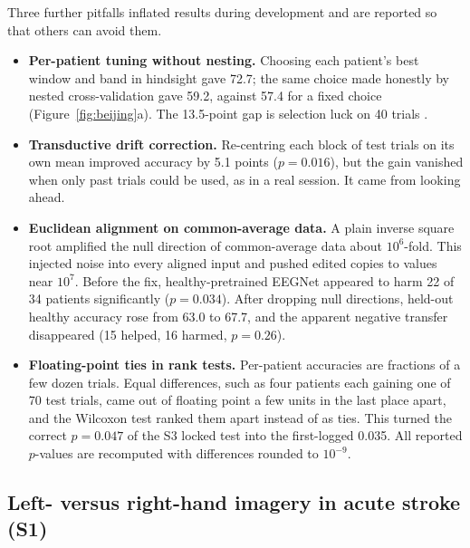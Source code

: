 Three further pitfalls inflated results during development and are reported so that others can avoid them.
\begin{itemize}
  \item \textbf{Per-patient tuning without nesting.} Choosing each patient's best window and band in hindsight gave 72.7\pct{}; the same choice made honestly by nested cross-validation gave 59.2\pct{}, against 57.4\pct{} for a fixed choice (Figure~\ref{fig:beijing}a). The 13.5-point gap is selection luck on 40 trials \citep{varoquaux2018}.
  \item \textbf{Transductive drift correction.} Re-centring each block of test trials on its own mean improved accuracy by 5.1 points ($p = 0.016$), but the gain vanished when only past trials could be used, as in a real session. It came from looking ahead.
  \item \textbf{Euclidean alignment on common-average data.} A plain inverse square root amplified the null direction of common-average data about $10^6$-fold. This injected noise into every aligned input and pushed edited copies to values near $10^7$. Before the fix, healthy-pretrained EEGNet appeared to harm 22 of 34 patients significantly ($p = 0.034$). After dropping null directions, held-out healthy accuracy rose from 63.0\pct{} to 67.7\pct{}, and the apparent negative transfer disappeared (15 helped, 16 harmed, $p = 0.26$).
  \item \textbf{Floating-point ties in rank tests.} Per-patient accuracies are fractions of a few dozen trials. Equal differences, such as four patients each gaining one of 70 test trials, came out of floating point a few units in the last place apart, and the Wilcoxon test ranked them apart instead of as ties. This turned the correct $p = 0.047$ of the S3 locked test into the first-logged 0.035. All reported $p$-values are recomputed with differences rounded to $10^{-9}$.
\end{itemize}

\subsection{Left- versus right-hand imagery in acute stroke (S1)}

